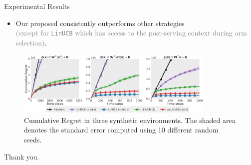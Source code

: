 \documentclass[10pt, xcolor=x11names,compress]{beamer}
\begin{document}
\begin{frame}{Experimental Results}

\begin{itemize}
    \item  Our proposed \polinucb consistently outperforms other strategies\\\textcolor{gray}{{\footnotesize (except for \texttt{LinUCB} which has access to the post-serving context during arm selection)}}.
\end{itemize}

\begin{figure}[h]
    \centering
    \includegraphics[width=0.85\textwidth]{figs/synthetic-comparisons.pdf}
    \vspace{0.2cm}
    \caption{{\small Cumulative Regret in three synthetic environments. The shaded area denotes the standard error computed using 10 different random seeds.}}
    \label{fig:synthetic-experiments}
\end{figure}

\end{frame}

\begin{frame}
 \begin{center}
		{\Huge Thank you.}
	\end{center}
\end{frame}
\end{document}
